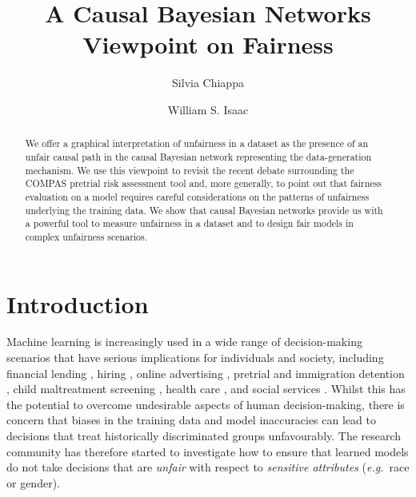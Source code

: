 \documentclass[runningheads]{llncs}
\newcommand{\eg}{\emph{e.g.}}
\begin{document}
%
\title{A Causal Bayesian Networks Viewpoint on Fairness}
%
%
\author{Silvia Chiappa\inst{}\and William S. Isaac\inst{}
\protect{}
}
%
%

%
\maketitle              %
%
\begin{abstract}
We offer a graphical interpretation of unfairness in a dataset as the presence of an unfair causal path in the causal Bayesian network representing the data-generation mechanism. We use this viewpoint to revisit the recent debate surrounding the COMPAS pretrial risk assessment tool and, more generally, to point out that fairness evaluation on a model requires careful considerations on the patterns of unfairness underlying the training data. 
We show that causal Bayesian networks provide us with a powerful tool to measure unfairness in a dataset and to design fair models in complex unfairness scenarios.
\end{abstract}

\section{Introduction\label{sec:Intro}}
Machine learning is increasingly used in a wide range of decision-making scenarios that have serious implications for individuals and society, including financial lending \cite{byanjankar15predicting,malekipirbazari15risk}, hiring \cite{bogen18hiring,hoffman18discretion}, online advertising \cite{he2014practical,perlich14machine}, pretrial and immigration detention \cite{angwin16machine,rosenberg18immigration}, child maltreatment screening \cite{chouldechova18child,vaithianathan13child}, health care \cite{defauw18clinically,kourou15machine}, and social services \cite{ainowinstitute18litigating,eubanks18automating}. 
Whilst this has the potential to overcome undesirable aspects of human decision-making, there is concern that biases in the training data and model inaccuracies can lead to decisions that treat historically discriminated groups unfavourably. The research community has therefore started to investigate how to ensure that learned models do not take decisions that are \emph{unfair} with respect to \emph{sensitive attributes} (\eg~race or gender). 
\end{document}
